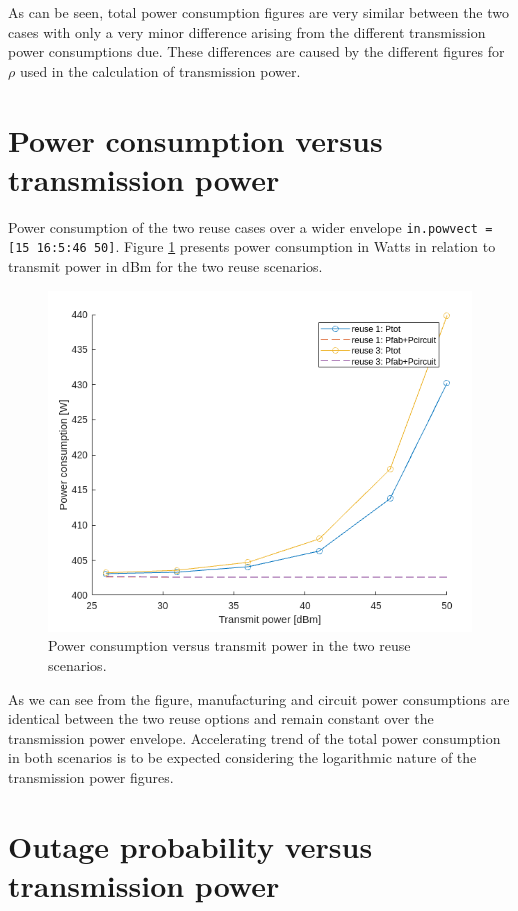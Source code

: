 \documentclass{article}
\begin{document}
As can be seen, total power consumption figures are very similar between the two cases with only a very minor difference arising from the different transmission power consumptions due. These differences are caused by the different figures for \(\rho\) used in the calculation of transmission power.

\section{Power consumption versus transmission power}
Power consumption of the two reuse cases over a wider envelope \texttt{in.powvect = [15 16:5:46 50]}. Figure \ref{fig:q5_Ptx_vs_Ptot} presents power consumption in Watts in relation to transmit power in dBm for the two reuse scenarios.

\begin{figure}[!htb]
    \centering
    \includegraphics[width=12cm]{images/q5_Ptx_vs_Ptot.png}
    \caption{Power consumption versus transmit power in the two reuse scenarios.}
    \label{fig:q5_Ptx_vs_Ptot}
\end{figure}

As we can see from the figure, manufacturing and circuit power consumptions are identical between the two reuse options and remain constant over the transmission power envelope. Accelerating trend of the total power consumption in both scenarios is to be expected considering the logarithmic nature of the transmission power figures.

\newpage
\section{Outage probability versus transmission power}
\end{document}
